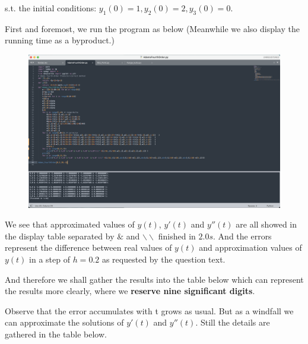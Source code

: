 \documentclass{article}
\begin{document}
    s.t. the initial conditions: $y_{1}(0)=1,y_{2}(0)=2,y_{3}(0)=0$. 

    First and foremost, we run the program as below (Meanwhile we also display the running time as a byproduct.)

    \begin{figure}[h]
    \centering
    \includegraphics[scale=0.2]{Program5}
    \end{figure}

    We see that approximated values of $y(t)$, $y'(t)$ and $y''(t)$ are all showed in the display table separated by $\&$ and $\backslash\backslash$ finished in $2.0s$. And the errors represent the difference between real values of $y(t)$ and approximation values of $y(t)$ in a step of $h=0.2$ as requested by the question text.

    And therefore we shall gather the results into the table below which can represent the results more clearly, where we \textbf{reserve nine significant digits}.

    Observe that the error accumulates with t grows as usual. But as a windfall we can approximate the solutions of $y'(t)$ and $y''(t)$. Still the details are gathered in the table below.
\end{document}
